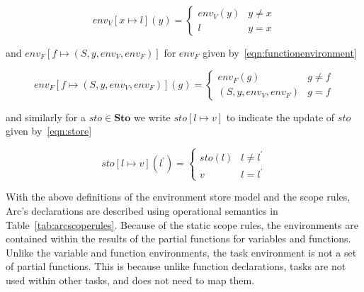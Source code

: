 \begin{equation}\label{eqn:variableenvironment}
    env_V[x \mapsto l](y) =
    \begin{cases}
        env_V(y) & y \neq x \\
        l        & y = x
    \end{cases}
\end{equation}


\noindent and $env_F[ f \mapsto (S, y, env_V, env_F)]$ for $env_F$ given by~\ref{eqn:functionenvironment}


\begin{equation}\label{eqn:functionenvironment}
    env_F[f \mapsto (S, y, env_V, env_F)](g) =
    \begin{cases}
        env_F(g)             & g \neq f \\
        (S, y, env_V, env_F) & g = f
    \end{cases}
\end{equation}


\noindent and similarly for a $sto \in \textbf{Sto}$ we write $sto[ l \mapsto v ]$ to indicate the update of $sto$ given by~\ref{eqn:store}


\begin{equation}\label{eqn:store}
    sto[l \mapsto v](l^\prime) =
    \begin{cases}
        sto(l) & l \neq l^\prime \\
        v      & l = l^\prime
    \end{cases}
\end{equation}


With the above definitions of the environment store model and the scope rules, Arc's declarations are described using operational semantics in Table~\ref{tab:arcscoperules}. Because of the static scope rules, the environments are contained within the results of the partial functions for variables and functions. Unlike the variable and function environments, the task environment is not a set of partial functions. This is because unlike function declarations, tasks are not used within other tasks, and does not need to map them.



